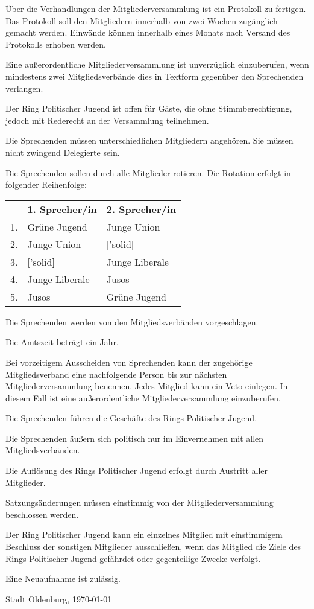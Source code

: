 \documentclass[10pt,a4paper,oneside,parskip=half]{scrartcl}
\begin{document}
\begin{contract}
Über die Verhandlungen der Mitgliederversammlung ist ein Protokoll zu fertigen. Das Protokoll soll den Mitgliedern innerhalb von zwei Wochen zugänglich gemacht werden. Einwände können innerhalb eines Monats nach Versand des Protokolls erhoben werden.

Eine außerordentliche Mitgliederversammlung ist unverzüglich einzuberufen, wenn mindestens zwei Mitgliedsverbände dies in Textform gegenüber den Sprechenden verlangen.

Der Ring Politischer Jugend ist offen für Gäste, die ohne Stimmberechtigung, jedoch mit Rederecht an der Versammlung teilnehmen.

Die Sprechenden müssen unterschiedlichen Mitgliedern angehören. Sie müssen nicht zwingend Delegierte sein.

Die Sprechenden sollen durch alle Mitglieder rotieren. Die Rotation erfolgt in folgender Reihenfolge:
\begin{tabu} to \textwidth {l X X}
& \textbf{1. Sprecher/in} & \textbf{2. Sprecher/in} \\
1. & Grüne Jugend & Junge Union \\
2. & Junge Union & ['solid] \\
3. & ['solid] & Junge Liberale \\
4. & Junge Liberale & Jusos \\
5. & Jusos & Grüne Jugend \\
\end{tabu}

Die Sprechenden werden von den Mitgliedsverbänden vorgeschlagen.

Die Amtszeit beträgt ein Jahr.

Bei vorzeitigem Ausscheiden von Sprechenden kann der zugehörige Mitgliedsverband eine nachfolgende Person bis zur nächsten Mitgliederversammlung benennen. Jedes Mitglied kann ein Veto einlegen. In diesem Fall ist eine außerordentliche Mitgliederversammlung einzuberufen.

Die Sprechenden führen die Geschäfte des Rings Politischer Jugend.

Die Sprechenden äußern sich politisch nur im Einvernehmen mit allen Mitgliedsverbänden.

Die Auflösung des Rings Politischer Jugend erfolgt durch Austritt aller Mitglieder.

Satzungsänderungen müssen einstimmig von der Mitgliederversammlung beschlossen werden.

Der Ring Politischer Jugend kann ein einzelnes Mitglied mit einstimmigem Beschluss der sonstigen Mitglieder ausschließen, wenn das Mitglied die Ziele des Rings Politischer Jugend gefährdet oder gegenteilige Zwecke verfolgt.

Eine Neuaufnahme ist zulässig.

\end{contract}
\vspace{1cm}
Stadt Oldenburg, \today
\end{document}

